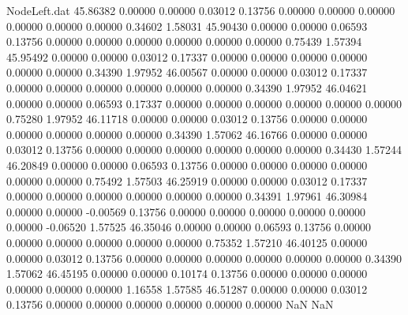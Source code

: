 \begin{filecontents}{NodeLeft.dat}
  45.86382    0.00000    0.00000     0.03012    0.13756    0.00000    0.00000    0.00000    0.00000    0.00000    0.00000    0.34602    1.58031
  45.90430    0.00000    0.00000     0.06593    0.13756    0.00000    0.00000    0.00000    0.00000    0.00000    0.00000    0.75439    1.57394
  45.95492    0.00000    0.00000     0.03012    0.17337    0.00000    0.00000    0.00000    0.00000    0.00000    0.00000    0.34390    1.97952
  46.00567    0.00000    0.00000     0.03012    0.17337    0.00000    0.00000    0.00000    0.00000    0.00000    0.00000    0.34390    1.97952
  46.04621    0.00000    0.00000     0.06593    0.17337    0.00000    0.00000    0.00000    0.00000    0.00000    0.00000    0.75280    1.97952
  46.11718    0.00000    0.00000     0.03012    0.13756    0.00000    0.00000    0.00000    0.00000    0.00000    0.00000    0.34390    1.57062
  46.16766    0.00000    0.00000     0.03012    0.13756    0.00000    0.00000    0.00000    0.00000    0.00000    0.00000    0.34430    1.57244
  46.20849    0.00000    0.00000     0.06593    0.13756    0.00000    0.00000    0.00000    0.00000    0.00000    0.00000    0.75492    1.57503
  46.25919    0.00000    0.00000     0.03012    0.17337    0.00000    0.00000    0.00000    0.00000    0.00000    0.00000    0.34391    1.97961
  46.30984    0.00000    0.00000    -0.00569    0.13756    0.00000    0.00000    0.00000    0.00000    0.00000    0.00000   -0.06520    1.57525
  46.35046    0.00000    0.00000     0.06593    0.13756    0.00000    0.00000    0.00000    0.00000    0.00000    0.00000    0.75352    1.57210
  46.40125    0.00000    0.00000     0.03012    0.13756    0.00000    0.00000    0.00000    0.00000    0.00000    0.00000    0.34390    1.57062
  46.45195    0.00000    0.00000     0.10174    0.13756    0.00000    0.00000    0.00000    0.00000    0.00000    0.00000    1.16558    1.57585
  46.51287    0.00000    0.00000     0.03012    0.13756    0.00000    0.00000    0.00000    0.00000    0.00000    0.00000        NaN        NaN
\end{filecontents}
